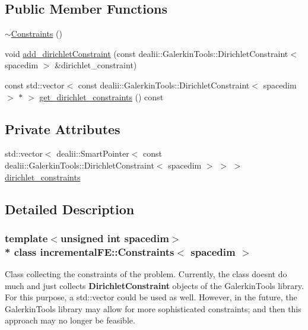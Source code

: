 \subsection*{Public Member Functions}
\begin{DoxyCompactItemize}
\item 
\hyperlink{classincremental_f_e_1_1_constraints_ab77495a668ae8925bd8095c2c80a8624}{$\sim$\+Constraints} ()
\item 
void \hyperlink{classincremental_f_e_1_1_constraints_a9cdbb5de13bb4af4d032019272baa880}{add\+\_\+dirichlet\+Constraint} (const dealii\+::\+Galerkin\+Tools\+::\+Dirichlet\+Constraint$<$ spacedim $>$ \&dirichlet\+\_\+constraint)
\item 
const std\+::vector$<$ const dealii\+::\+Galerkin\+Tools\+::\+Dirichlet\+Constraint$<$ spacedim $>$ $\ast$ $>$ \hyperlink{classincremental_f_e_1_1_constraints_a070b000db6079a35095f0c277a773d66}{get\+\_\+dirichlet\+\_\+constraints} () const 
\end{DoxyCompactItemize}
\subsection*{Private Attributes}
\begin{DoxyCompactItemize}
\item 
std\+::vector$<$ dealii\+::\+Smart\+Pointer$<$ const dealii\+::\+Galerkin\+Tools\+::\+Dirichlet\+Constraint$<$ spacedim $>$ $>$ $>$ \hyperlink{classincremental_f_e_1_1_constraints_aaa6042a72b76026d58416affbf056688}{dirichlet\+\_\+constraints}
\end{DoxyCompactItemize}


\subsection{Detailed Description}
\subsubsection*{template$<$unsigned int spacedim$>$\\*
class incremental\+F\+E\+::\+Constraints$<$ spacedim $>$}

Class collecting the constraints of the problem. Currently, the class doesn\textquotesingle{}t do much and just collects {\bf Dirichlet\+Constraint} objects of the Galerkin\+Tools library. For this purpose, a {\ttfamily std\+::vector} could be used as well. However, in the future, the Galerkin\+Tools library may allow for more sophisticated constraints; and then this approach may no longer be feasible.

